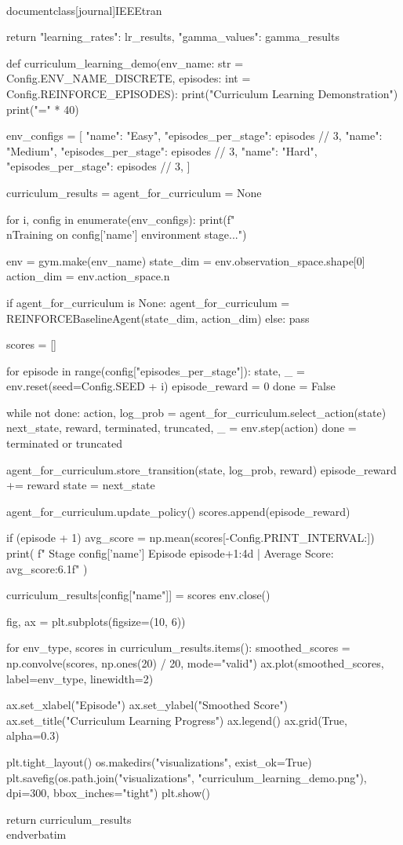 \\documentclass[journal]{IEEEtran}
\begin{document}
    return {"learning_rates": lr_results, "gamma_values": gamma_results}


def curriculum_learning_demo(env_name: str = Config.ENV_NAME_DISCRETE, episodes: int = Config.REINFORCE_EPISODES):
    print("Curriculum Learning Demonstration")
    print("=" * 40)

    env_configs = [
        {"name": "Easy", "episodes_per_stage": episodes // 3},
        {"name": "Medium", "episodes_per_stage": episodes // 3},
        {"name": "Hard", "episodes_per_stage": episodes // 3},
    ]

    curriculum_results = {}
    agent_for_curriculum = None

    for i, config in enumerate(env_configs):
        print(f"\\nTraining on {config['name']} environment stage...")

        env = gym.make(env_name)
        state_dim = env.observation_space.shape[0]
        action_dim = env.action_space.n

        if agent_for_curriculum is None:
            agent_for_curriculum = REINFORCEBaselineAgent(state_dim, action_dim)
        else:
            pass

        scores = []

        for episode in range(config["episodes_per_stage"]):
            state, _ = env.reset(seed=Config.SEED + i)
            episode_reward = 0
            done = False

            while not done:
                action, log_prob = agent_for_curriculum.select_action(state)
                next_state, reward, terminated, truncated, _ = env.step(action)
                done = terminated or truncated

                agent_for_curriculum.store_transition(state, log_prob, reward)
                episode_reward += reward
                state = next_state

            agent_for_curriculum.update_policy()
            scores.append(episode_reward)

            if (episode + 1) %
                avg_score = np.mean(scores[-Config.PRINT_INTERVAL:])
                print(
                    f"  Stage {config['name']} Episode {episode+1:4d} | Average Score: {avg_score:6.1f}"
                )

        curriculum_results[config["name"]] = scores
        env.close()

    fig, ax = plt.subplots(figsize=(10, 6))

    for env_type, scores in curriculum_results.items():
        smoothed_scores = np.convolve(scores, np.ones(20) / 20, mode="valid")
        ax.plot(smoothed_scores, label=env_type, linewidth=2)

    ax.set_xlabel("Episode")
    ax.set_ylabel("Smoothed Score")
    ax.set_title("Curriculum Learning Progress")
    ax.legend()
    ax.grid(True, alpha=0.3)

    plt.tight_layout()
    os.makedirs("visualizations", exist_ok=True)
    plt.savefig(os.path.join("visualizations", "curriculum_learning_demo.png"), dpi=300, bbox_inches="tight")
    plt.show()

    return curriculum_results
\\end{verbatim}
\end{document}
